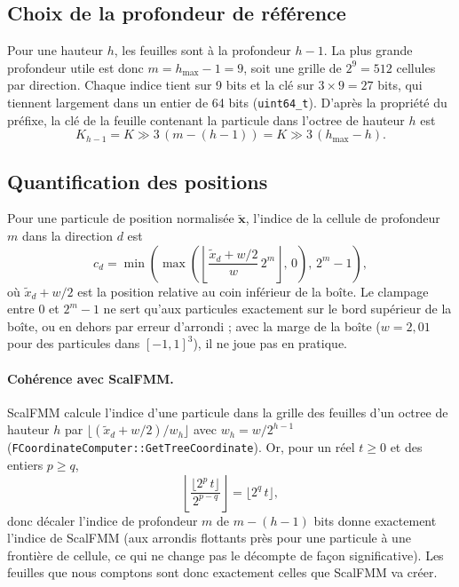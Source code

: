 \documentclass[11pt,a4paper]{article}
\newcommand{\code}[1]{\texttt{#1}}
\begin{document}
\subsection{Choix de la profondeur de référence}

Pour une hauteur $h$, les feuilles sont à la profondeur $h-1$. La plus grande profondeur utile
est donc $m = h_{\max} - 1 = 9$, soit une grille de $2^9 = 512$ cellules par direction. Chaque
indice tient sur 9 bits et la clé sur $3 \times 9 = 27$ bits, qui tiennent largement dans un
entier de 64 bits (\code{uint64\_t}). D'après la propriété du préfixe, la clé de la feuille
contenant la particule dans l'octree de hauteur $h$ est
\begin{equation}
K_{h-1} = K \gg 3\,(m - (h-1)) = K \gg 3\,(h_{\max} - h).
\label{eq:shift}
\end{equation}

\subsection{Quantification des positions}

Pour une particule de position normalisée $\tilde{\mathbf{x}}$, l'indice de la cellule de
profondeur $m$ dans la direction $d$ est
\begin{equation}
c_d = \min\left(\max\left(\left\lfloor \frac{\tilde{x}_d + w/2}{w}\, 2^m \right\rfloor,\, 0\right),\,
2^m - 1\right),
\label{eq:quant}
\end{equation}
où $\tilde{x}_d + w/2$ est la position relative au coin inférieur de la boîte. Le
\og clampage\fg{} entre $0$ et $2^m-1$ ne sert qu'aux particules exactement sur le bord supérieur
de la boîte, ou en dehors par erreur d'arrondi ; avec la marge de la boîte ($w = 2{,}01$ pour des
particules dans $[-1,1]^3$), il ne joue pas en pratique.

\paragraph{Cohérence avec ScalFMM.} ScalFMM calcule l'indice d'une particule dans la grille des
feuilles d'un octree de hauteur $h$ par
$\lfloor (\tilde{x}_d + w/2) / w_h \rfloor$ avec $w_h = w/2^{h-1}$
(\code{FCoordinateComputer::GetTreeCoordinate}). Or, pour un réel $t \ge 0$ et des entiers
$p \ge q$,
\[
\left\lfloor \frac{\lfloor 2^p\, t \rfloor}{2^{p-q}} \right\rfloor = \lfloor 2^q\, t \rfloor,
\]
donc décaler l'indice de profondeur $m$ de $m - (h-1)$ bits donne exactement l'indice de
ScalFMM (aux arrondis flottants près pour une particule à une frontière de cellule, ce qui ne
change pas le décompte de façon significative). Les feuilles que nous comptons sont donc
exactement celles que ScalFMM va créer.
\end{document}
